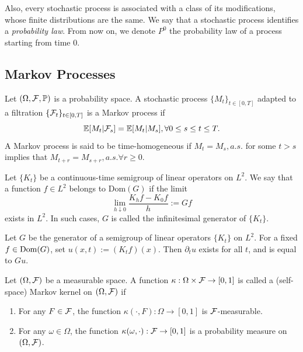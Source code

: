 Also, every stochastic process is associated with a class of its modifications, whose finite distributions are the same. We say that a stochastic process identifies a \textit{probability law}. From now on, we denote $P^0$ the probability law of a process starting from time $0$.

\subsection{Markov Processes}

\begin{definition}
 Let $(\Omega, \mathcal{F}, \mathbb{P})$ is a probability space. A stochastic process $\{M_t\}_{t\in[0,T]}$ adapted to a filtration $\{\mathcal{F}_t\}_{t\in[0,T]}$ is a Markov process if
 \begin{equation}
  \mathbb{E}[M_t|\mathcal{F}_s] = \mathbb{E}[M_t|M_s],  \forall 0 \le s \le t \le T.
 \end{equation}
 A Markov process is said to be time-homogeneous if $M_t = M_s, a.s.$ for some $t > s$ implies that $M_{t+r} = M_{s+r}, a.s. \forall r\ge0$.
\end{definition}

\begin{definition}
 Let $\{K_t\}$ be a continuous-time semigroup of linear operators on $L^2$. We say that a function $f\in L^2$ belongs to $\mathrm{Dom}(G)$ if the limit
 \begin{equation}
  \lim\limits_{h\downarrow 0}\dfrac{K_hf - K_0f}{h} := Gf
 \end{equation}
 exists in $L^2$. In such cases, $G$ is called the infinitesimal generator of $\{K_t\}$.
\end{definition}

\begin{theorem}
 Let $G$ be the generator of a semigroup of linear operators $\{K_t\}$ on $L^2$. For a fixed $f\in\mathrm{Dom}(G)$, set $u(x,t) := (K_tf)(x)$. Then $\partial_t u$ exists for all $t$, and is equal to $Gu$.
\end{theorem}


\begin{definition}
 Let $(\Omega, \mathcal{F})$ be a measurable space. A function $\kappa: \Omega\times\mathcal{F}\to[0,1]$ is called a (self-space) Markov kernel on $(\Omega, \mathcal{F})$  if
 \begin{enumerate}[label=(\roman*), ref=(\roman*)]
  \item For any $F\in\mathcal{F}$, the function $\kappa(\cdot, F): \Omega \to [0,1]$ is $\mathcal{F}$-measurable.
  \item For any $\omega\in\Omega$, the function $\kappa(\omega, \cdot): \mathcal{F}\to [0,1]$ is a probability measure on $(\Omega, \mathcal{F})$.
 \end{enumerate}
\end{definition}

